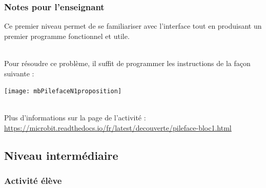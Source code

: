 \newpage
\subsubsection{Notes pour l'enseignant}

Ce premier niveau permet de se familiariser avec l’interface tout en produisant un premier programme fonctionnel et utile.

\begin{minipage}[t]{0.5\linewidth}
    \begin{methode}~\\
    Pour résoudre ce problème, il suffit de programmer les instructions de la façon suivante :
    
    \texttt{[image: mbPilefaceN1proposition]}
    \end{methode}
\end{minipage}
\hfill
\begin{minipage}[t]{0.5\linewidth}
    \begin{remarque}~\\
    Plus d'informations sur la page de l'activité :\\ \url{https://microbit.readthedocs.io/fr/latest/decouverte/pileface-bloc1.html}
    \end{remarque}
\end{minipage}









%
%
\newpage
\subsection{Niveau intermédiaire}
\subsubsection{Activité élève}



